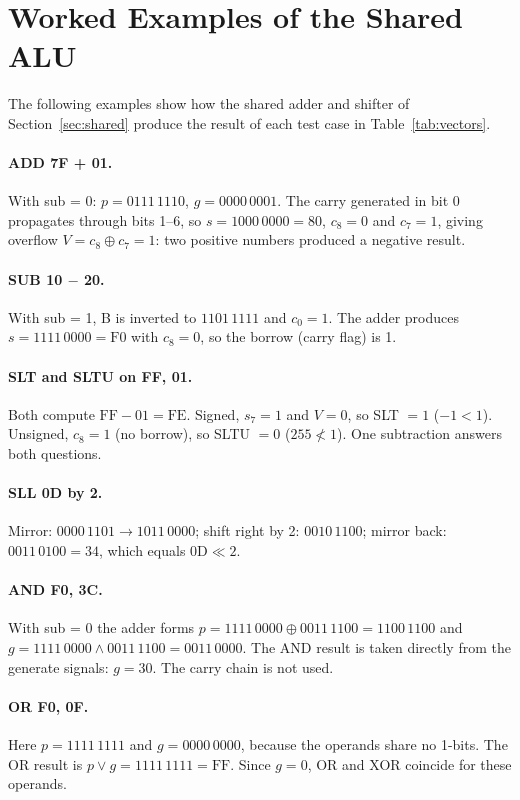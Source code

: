 \documentclass[12pt,a4paper,twoside]{article}
\begin{document}
\clearpage
\section{Worked Examples of the Shared ALU}
\label{app:worked}

The following examples show how the shared adder and shifter of
Section~\ref{sec:shared} produce the result of each test case in
Table~\ref{tab:vectors}.

\paragraph{ADD 7F + 01.} With sub = 0: $p = 0111\,1110$, $g = 0000\,0001$. The
carry generated in bit 0 propagates through bits 1--6, so $s = 1000\,0000 = 80$,
$c_8 = 0$ and $c_7 = 1$, giving overflow $V = c_8 \oplus c_7 = 1$: two positive
numbers produced a negative result.

\paragraph{SUB 10 $-$ 20.} With sub = 1, B is inverted to $1101\,1111$ and
$c_0 = 1$. The adder produces $s = 1111\,0000 = \mathrm{F0}$ with $c_8 = 0$, so the
borrow (carry flag) is 1.

\paragraph{SLT and SLTU on FF, 01.} Both compute $\mathrm{FF} - 01 = \mathrm{FE}$.
Signed, $s_7 = 1$ and $V = 0$, so SLT $= 1$ ($-1 < 1$). Unsigned, $c_8 = 1$ (no
borrow), so SLTU $= 0$ ($255 \not< 1$). One subtraction answers both questions.

\paragraph{SLL 0D by 2.} Mirror: $0000\,1101 \to 1011\,0000$; shift right by 2:
$0010\,1100$; mirror back: $0011\,0100 = 34$, which equals $0\mathrm{D} \ll 2$.

\paragraph{AND F0, 3C.} With sub = 0 the adder forms
$p = 1111\,0000 \oplus 0011\,1100 = 1100\,1100$ and
$g = 1111\,0000 \land 0011\,1100 = 0011\,0000$. The AND result is taken directly
from the generate signals: $g = 30$. The carry chain is not used.

\paragraph{OR F0, 0F.} Here $p = 1111\,1111$ and $g = 0000\,0000$, because the
operands share no 1-bits. The OR result is $p \lor g = 1111\,1111 = \mathrm{FF}$.
Since $g = 0$, OR and XOR coincide for these operands.
\end{document}
